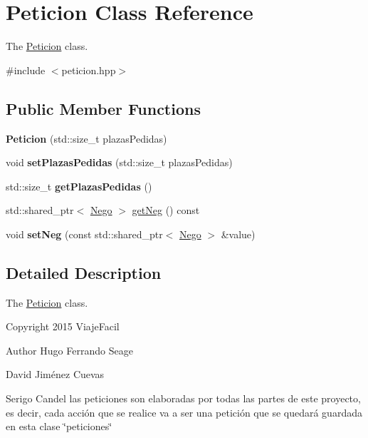 \hypertarget{classPeticion}{}\section{Peticion Class Reference}
\label{classPeticion}


The \hyperlink{classPeticion}{Peticion} class.  




{\ttfamily \#include $<$peticion.\+hpp$>$}

\subsection*{Public Member Functions}
\begin{DoxyCompactItemize}
\item 
\hypertarget{classPeticion_adca26c8f1c41bc14c69cad5ac7713e3c}{}{\bfseries Peticion} (std\+::size\+\_\+t plazas\+Pedidas)\label{classPeticion_adca26c8f1c41bc14c69cad5ac7713e3c}

\item 
\hypertarget{classPeticion_a75bbeae7cedba0b5c32993f1f3f9c7e1}{}void {\bfseries set\+Plazas\+Pedidas} (std\+::size\+\_\+t plazas\+Pedidas)\label{classPeticion_a75bbeae7cedba0b5c32993f1f3f9c7e1}

\item 
\hypertarget{classPeticion_a58a129027db952f86676a721c7acc6c4}{}std\+::size\+\_\+t {\bfseries get\+Plazas\+Pedidas} ()\label{classPeticion_a58a129027db952f86676a721c7acc6c4}

\item 
std\+::shared\+\_\+ptr$<$ \hyperlink{classNego}{Nego} $>$ \hyperlink{classPeticion_a09a935e534f00ff9d3fb11cfd810e189}{get\+Neg} () const 
\item 
\hypertarget{classPeticion_a58b976cd1ce63f7c9602b5940872c4b7}{}void {\bfseries set\+Neg} (const std\+::shared\+\_\+ptr$<$ \hyperlink{classNego}{Nego} $>$ \&value)\label{classPeticion_a58b976cd1ce63f7c9602b5940872c4b7}

\end{DoxyCompactItemize}


\subsection{Detailed Description}
The \hyperlink{classPeticion}{Peticion} class. 

Copyright 2015 Viaje\+Facil \begin{DoxyAuthor}{Author}
Hugo Ferrando Seage 

David Jiménez Cuevas 

Serigo Candel las peticiones son elaboradas por todas las partes de este proyecto, es decir, cada acción que se realice va a ser una petición que se quedará guardada en esta clase \char`\"{}peticiones\char`\"{} 
\end{DoxyAuthor}


